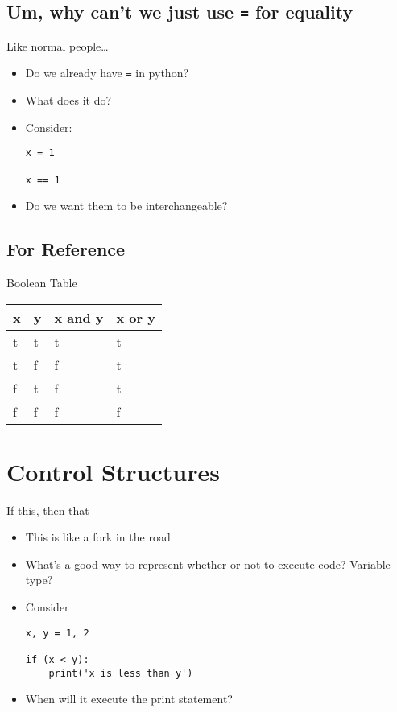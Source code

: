 \documentclass[11pt]{article}
\begin{document}
\subsection{Um, why can't we just use \texttt{=} for equality}
\label{sec:orgd99f7c9}
Like normal people\ldots{}
\begin{itemize}
\item Do we already have \texttt{=} in python?
\item What does it do?
\item Consider:
\begin{verbatim}
x = 1

x == 1
\end{verbatim}
\item Do we want them to be interchangeable?
\end{itemize}
\subsection{For Reference}
\label{sec:org12ccced}
Boolean Table
\begin{center}
\begin{tabular}{llll}
x & y & x and y & x or y\\
\hline
t & t & t & t\\
t & f & f & t\\
f & t & f & t\\
f & f & f & f\\
\end{tabular}
\end{center}

\section{Control Structures}
\label{sec:orgf4e746a}
If this, then that

\begin{itemize}
\item This is like a fork in the road
\item What's a good way to represent whether or not to execute code?  Variable type?
\item Consider
\begin{verbatim}
x, y = 1, 2

if (x < y):
    print('x is less than y')
\end{verbatim}
\item When will it execute the print statement?
\end{itemize}
\end{document}
